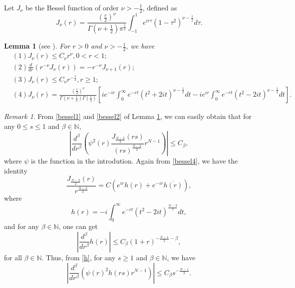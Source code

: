 \documentclass[a4paper,11pt, reqno]{amsart}
\numberwithin{equation}{section}
\theoremstyle{plain}
\newtheorem{lemma}[theorem]{Lemma}
\theoremstyle{definition}
\theoremstyle{remark}
\newtheorem{remark}[theorem]{Remark}
\begin{document}
Let $J_\nu$ be the Bessel function of order $\nu>-\frac{1}{2}$, defined as
\begin{equation*}
J_\nu(r)=\frac{(\frac{r}{2})^\nu}{\Gamma(\nu+\frac{1}{2})\pi^{\frac{1}{2}}}\int_{-1}^1e^{ir\tau}(1-\tau^2)^{\nu-\frac{1}{2}}d\tau.
\end{equation*}

\begin{lemma}[see \cite{Grafakos2008}]\label{Bessel}
For $r>0$ and $\nu>-\frac{1}{2}$, we have
\begin{align}
&(1)J_\nu(r)\leq C_\nu r^\nu,0<r<1;\label{bessel1}\\
&(2)\frac{d}{dr}\left(r^{-\nu}J_\nu(r)\right)=-r^{-\nu}J_{\nu+1}(r);\label{bessel2}\\
&(3)J_\nu(r)\leq C_\nu r^{-\frac{1}{2}}, r\geq1;\label{bessel3}\\
&(4)J_\nu(r)=\frac{(\frac{r}{2})^\nu}{\Gamma(\nu+\frac{1}{2})\Gamma(\frac{1}{2})} \left[ie^{-ir}\int_0^\infty e^{-rt}(t^2+2it)^{\nu-\frac{1}{2}}dt-ie^{ir}\int_0^\infty e^{-rt}(t^2-2it)^{\nu-\frac{1}{2}}dt\right].\label{bessel4}
\end{align}
\end{lemma}
\begin{remark}
From \eqref{bessel1} and \eqref{bessel2} of Lemma \ref{Bessel}, we can easily obtain that for any $0\leq s\leq 1$ and $\beta\in\mathbb{N}$,
\begin{equation}\label{small-s}
  \left|\frac{d^\beta}{dr^\beta}\left(\psi^2(r)\frac{J_{\frac{N-2}{2}}(rs)}{(rs)^\frac{N-2}{2}}  r^{N-1}\right)\right|\leq C_{\beta},
\end{equation}
where $\psi$ is the function in the introdution.
Again from \eqref{bessel4}, we have the identity
\begin{equation}\label{Bessel-Fourier}
    \frac{J_{\frac{N-2}{2}}(r)}{r^\frac{N-2}{2}}=C\left(e^{ir}h(r)+e^{-ir}\overline{h(r)}\right),
\end{equation}
 where $$h(r)=-i\int_0^\infty e^{-rt}(t^2-2it)^\frac{N-3}{2}dt,$$
 and  for any $\beta\in\mathbb{N}$, one can get     
\begin{equation}\label{h}
\left|\frac{d^\beta}{dr^\beta}h(r)\right|\leq C_\beta(1+r)^{-\frac{N-1}{2}-\beta},
\end{equation}
for all $\beta\in\mathbb{N}$. Thus, from \eqref{h}, for any $s\geq1$ and $\beta\in\mathbb{N}$, we have
\begin{equation}\label{big-s}
\left|\frac{d^\beta}{dr^\beta}\left(\psi(r)^2h(rs) r^{N-1}\right)\right|\leq C_\beta s^{-\frac{N-1}{2}}.
\end{equation}
\end{remark}
\end{document}
